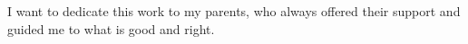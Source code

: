 

I want to dedicate this work to my parents, who always offered their support and guided me to what is good and right.

